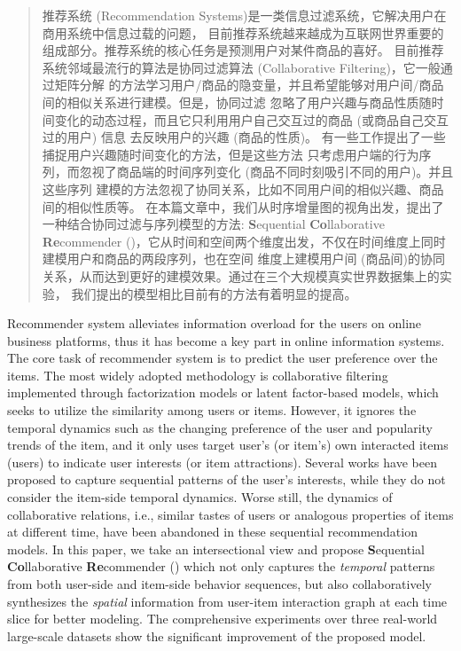 
\begin{abstract}
推荐系统 (Recommendation Systems)是一类信息过滤系统，它解决用户在商用系统中信息过载的问题，
目前推荐系统越来越成为互联网世界重要的组成部分。推荐系统的核心任务是预测用户对某件商品的喜好。
目前推荐系统邻域最流行的算法是协同过滤算法 (Collaborative Filtering)，它一般通过矩阵分解
的方法学习用户/商品的隐变量，并且希望能够对用户间/商品间的相似关系进行建模。但是，协同过滤
忽略了用户兴趣与商品性质随时间变化的动态过程，而且它只利用用户自己交互过的商品 (或商品自己交互过的用户) 信息
去反映用户的兴趣 (商品的性质)。
有一些工作提出了一些捕捉用户兴趣随时间变化的方法，但是这些方法
只考虑用户端的行为序列，而忽视了商品端的时间序列变化 (商品不同时刻吸引不同的用户)。并且这些序列
建模的方法忽视了协同关系，比如不同用户间的相似兴趣、商品间的相似性质等。
在本篇文章中，我们从时序增量图的视角出发，提出了一种结合协同过滤与序列模型的方法: \textbf{S}equential \textbf{Co}llaborative \textbf{Re}commender 
(\score)，它从时间和空间两个维度出发，不仅在时间维度上同时建模用户和商品的两段序列，也在空间
维度上建模用户间 (商品间)的协同关系，从而达到更好的建模效果。通过在三个大规模真实世界数据集上的实验，
我们提出的模型相比目前有的方法有着明显的提高。


\end{abstract}

\begin{englishabstract}
    Recommender system alleviates information overload for the users on online business platforms, thus it has become a key part in online information systems. The core task of recommender system is to predict the user preference over the items.
    The most widely adopted methodology is collaborative filtering implemented through factorization models or latent factor-based models, which seeks to utilize the similarity among users or items. However, it ignores the temporal dynamics such as the changing preference of the user and popularity trends of the item, and it only uses target user's (or item's) own interacted items (users) to indicate user interests (or item attractions).
    Several works have been proposed to capture sequential patterns of the user's interests, while they do not consider the item-side temporal dynamics. Worse still, the dynamics of collaborative relations, i.e., similar tastes of users or analogous properties of items at different time, have been abandoned in these sequential recommendation models. 
    In this paper, we take an intersectional view and propose \textbf{S}equential \textbf{Co}llaborative \textbf{Re}commender (\score) which not only captures the \textit{temporal} patterns from both user-side and item-side behavior sequences, but also collaboratively synthesizes the \textit{spatial} information from user-item interaction graph at each time slice for better modeling. The comprehensive experiments over three real-world large-scale datasets show the significant improvement of the proposed model.

\end{englishabstract}

